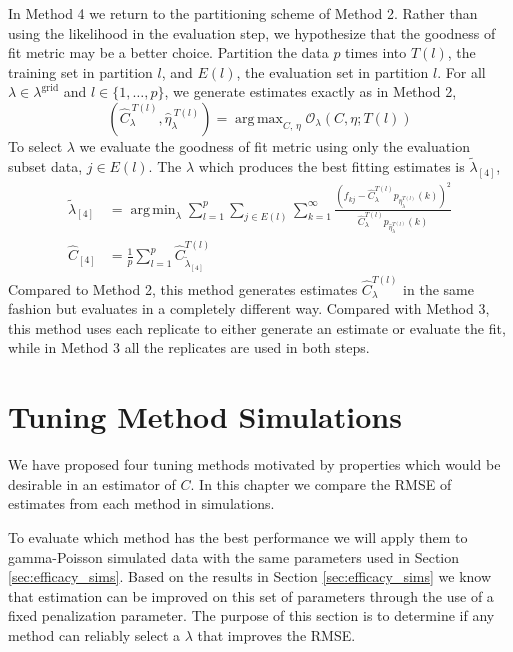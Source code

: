 \documentclass[oupdraft]{bio}
\DeclareMathOperator*{\argmin}{arg\,min}
\DeclareMathOperator*{\argmax}{arg\,max}
\newcommand{\lambdagrid}{\lambda^{\text{grid}}}
\begin{document}
In Method 4 we return to the partitioning scheme of Method 2.  Rather than using the likelihood in the evaluation step, we hypothesize that the goodness of fit metric may be a better choice.  Partition the data $p$ times into $T(l)$, the training set in partition $l$, and $E(l)$, the evaluation set in partition $l$.  For all $\lambda \in \lambdagrid$ and $l \in \{1, \dots , p \}$, we generate estimates exactly as in Method 2,
\begin{equation}
\left(\widehat{C}_{\lambda}^{ \ T(l)}, \widehat{\eta}_{\lambda}^{ \ T(l)} \right) = \argmax_{C, \, \eta} \mathcal{O}_\lambda \left(C, \eta; T(l) \right) \label{eq:c_hat_lambda_method_4}
\end{equation}
To select $\lambda$ we evaluate the goodness of fit metric using only the evaluation subset data, $j \in E(l)$.  The $\lambda$ which produces the best fitting estimates is $\widetilde{\lambda}_{[4]}$,
\begin{align}
\widetilde{\lambda}_{[4]} &= \argmin_{\lambda} \sum_{l = 1}^p \sum_{j \in E(l)} \sum_{k=1}^{\infty} \frac{ \left( f_{kj} - \widehat{C}_{\lambda}^{T(l)} p_{\widehat{\eta}_{\lambda}^{T(l)}}(k) \right)^2}{\widehat{C}_{\lambda}^{T(l)}p_{\widehat{\eta}_{\lambda}^{T(l)}}(k)} \\
\widehat{C}_{[4]} &= \frac{1}{p} \sum_{l=1}^p \widehat{C}_{\widetilde{\lambda}_{[4]}}^{T(l)} 
\end{align}
Compared to Method 2, this method generates estimates $\widehat{C}^{T(l)}_{\lambda}$ in the same fashion but evaluates in a completely different way.   Compared with Method 3, this method uses each replicate to either generate an estimate or evaluate the fit, while in Method 3 all the replicates are used in both steps.

\section{Tuning Method Simulations}
\label{sec:tuning_simulations}

We have proposed four tuning methods motivated by properties which would be desirable in an estimator of $C$.  In this chapter we compare the RMSE of estimates from each method in simulations.

To evaluate which method has the best performance we will apply them to gamma-Poisson simulated data with the same parameters used in Section \ref{sec:efficacy_sims}.  Based on the results in Section \ref{sec:efficacy_sims} we know that estimation can be improved on this set of parameters through the use of a fixed penalization parameter.  The purpose of this section is to determine if any method can reliably select a $\lambda$ that improves the RMSE.
\end{document}
